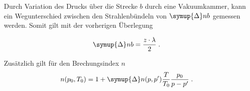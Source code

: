 \noindent
Durch Variation des Drucks über die Strecke $b$ durch eine Vakuumkammer, kann ein Wegunterschied zwischen den Strahlenbündeln von $\symup{\Delta}nb$ gemessen werden. Somit 
gilt mit der vorherigen Überlegung

\begin{equation*}
    \symup{\Delta}nb = \frac{z \cdot \lambda}{2} \; .
    \label{eqn:nb2}
  \end{equation*}

\noindent
Zusätzlich gilt für den Brechungsindex $n$ 
\begin{equation*}
  n(p_0, T_0) = 1 + \symup{\Delta} n (p,p') \frac{T}{T_0} \frac{p_0}{p - p'} \; .
  \label{eqn:brech}
\end{equation*}

